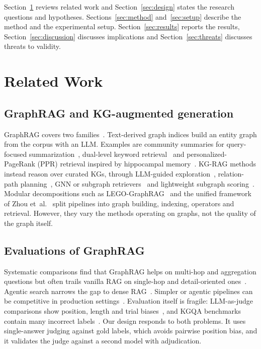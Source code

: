 \documentclass[11pt]{article}
\begin{document}
Section~\ref{sec:related} reviews related work and Section~\ref{sec:design} states the research questions and hypotheses. Sections~\ref{sec:method} and~\ref{sec:setup} describe the method and the experimental setup. Section~\ref{sec:results} reports the results, Section~\ref{sec:discussion} discusses implications and Section~\ref{sec:threats} discusses threats to validity.

\section{Related Work}\label{sec:related}
\subsection{GraphRAG and KG-augmented generation}
GraphRAG covers two families~\cite{peng2025survey,han2024graphrag,pan2024unifying}. Text-derived graph indices build an entity graph from the corpus with an LLM. Examples are community summaries for query-focused summarization~\cite{edge2024local}, dual-level keyword retrieval~\cite{guo2025lightrag} and personalized-PageRank (PPR) retrieval inspired by hippocampal memory~\cite{gutierrez2024hipporag,gutierrez2025rag2memory}. KG-RAG methods instead reason over curated KGs, through LLM-guided exploration~\cite{sun2023tog}, relation-path planning~\cite{luo2023rog}, GNN or subgraph retrievers~\cite{he2024gretriever,mavromatis2025gnnrag} and lightweight subgraph scoring~\cite{li2024subgraphrag}. Modular decompositions such as LEGO-GraphRAG~\cite{cao2025lego} and the unified framework of Zhou et~al.~\cite{zhou2025indepth} split pipelines into graph building, indexing, operators and retrieval. However, they vary the methods operating on graphs, not the quality of the graph itself.

\subsection{Evaluations of GraphRAG}
Systematic comparisons find that GraphRAG helps on multi-hop and aggregation questions but often trails vanilla RAG on single-hop and detail-oriented ones~\cite{han2026ragvs,xiang2025when}. Agentic search narrows the gap to dense RAG~\cite{fan2026still}. Simpler or agentic pipelines can be competitive in production settings~\cite{chen2026needed}. Evaluation itself is fragile: LLM-as-judge comparisons show position, length and trial biases~\cite{zeng2025significant,zheng2023judge}, and KGQA benchmarks contain many incorrect labels~\cite{zhang2025pitfalls}. Our design responds to both problems. It uses single-answer judging against gold labels, which avoids pairwise position bias, and it validates the judge against a second model with adjudication.
\end{document}
